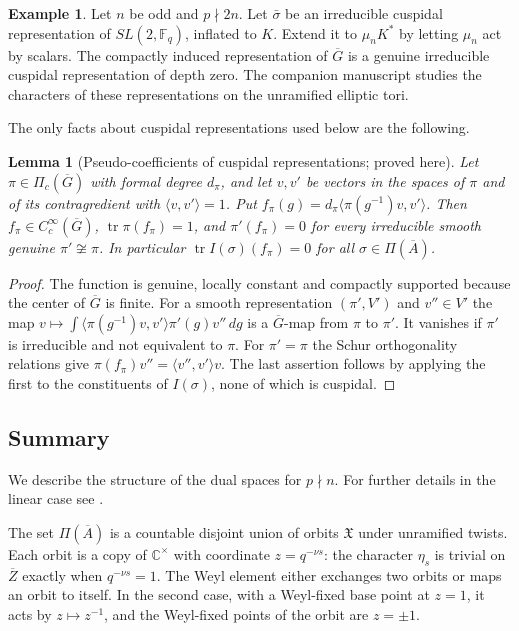 \documentclass[12pt,letterpaper]{article}
\numberwithin{equation}{section}
\newtheorem{xlemma}[theorem]{Lemma}
\theoremstyle{definition}
\newtheorem{xexample}[theorem]{Example}
\newcommand{\proved}{proved here}
\newcommand{\C}{\mathbb C}
\newcommand{\bG}{\overline{G}}
\newcommand{\bA}{\overline{A}}
\newcommand{\bZ}{\overline{Z}}
\newcommand{\fX}{\mathfrak X}
\DeclareMathOperator{\tr}{tr}
\begin{document}
\begin{xexample}\label{ex:depth-zero}
Let $n$ be odd and $p\nmid2n$.  Let $\bar\sigma$ be an irreducible cuspidal representation
of $SL(2,\mathbb F_q)$, inflated to $K$.  Extend it to $\mu_nK^*$ by letting $\mu_n$ act by
scalars.  The compactly induced representation of $\bG$ is a genuine irreducible cuspidal
representation of depth zero.  The companion manuscript \cite{JoCh} studies the
characters of these representations on the unramified elliptic tori.
\end{xexample}

The only facts about cuspidal representations used below are the following.

\begin{xlemma}[Pseudo-coefficients of cuspidal representations; \proved]\label{lem:pseudo}
Let $\pi\in\Pi_c(\bG)$ with formal degree $d_\pi$, and let $v,v'$ be vectors in the spaces
of $\pi$ and of its contragredient with $\langle v,v'\rangle=1$.  Put
$f_\pi(g)=d_\pi\langle\pi(g^{-1})v,v'\rangle$.  Then $f_\pi\in C_c^\infty(\bG)$,
$\tr\pi(f_\pi)=1$, and $\pi'(f_\pi)=0$ for every irreducible smooth genuine $\pi'\not\cong\pi$.
In particular $\tr I(\sigma)(f_\pi)=0$ for all $\sigma\in\Pi(\bA)$.
\end{xlemma}
\begin{proof}
The function is genuine, locally constant and compactly supported because the center of
$\bG$ is finite.  For a smooth representation $(\pi',V')$ and $v''\in V'$ the map
$v\mapsto\int\langle\pi(g^{-1})v,v'\rangle\pi'(g)v''\,dg$ is a $\bG$-map from $\pi$ to
$\pi'$.  It vanishes if $\pi'$ is irreducible and not equivalent to $\pi$.  For $\pi'=\pi$
the Schur orthogonality relations give $\pi(f_\pi)v''=\langle v'',v'\rangle v$.  The last
assertion follows by applying the first to the constituents of $I(\sigma)$, none of which
is cuspidal.
\end{proof}

\subsection{Summary}\label{subsec:summary-dual}

We describe the structure of the dual spaces for $p\nmid n$.  For further details in the
linear case see \cite{Jo94a}.

The set $\Pi(\bA)$ is a countable disjoint union of orbits $\fX$ under unramified twists.
Each orbit is a copy of $\C^\times$ with coordinate $z=q^{-\nu s}$: the character $\eta_s$
is trivial on $\bZ$ exactly when $q^{-\nu s}=1$.  The Weyl element either exchanges two
orbits or maps an orbit to itself.  In the second case, with a Weyl-fixed base point at
$z=1$, it acts by $z\mapsto z^{-1}$, and the Weyl-fixed points of the orbit are $z=\pm1$.
\end{document}
